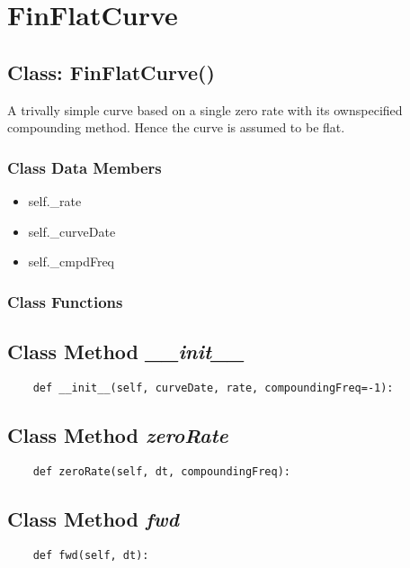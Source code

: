 \documentclass[twoside,11pt]{book}
\begin{document}
\newpage
\section{FinFlatCurve}

\subsection{Class: FinFlatCurve()}
A trivally simple curve based on a single zero rate with its ownspecified compounding method. Hence the curve is assumed to be flat. 

\subsubsection{Class Data Members}
\begin{itemize}
\item{self.\_rate}
\item{self.\_curveDate}
\item{self.\_cmpdFreq}
\end{itemize}

\subsubsection{Class Functions}

\subsection{Class Method {\it \_\_init\_\_}}


\begin{lstlisting}
    def __init__(self, curveDate, rate, compoundingFreq=-1):
\end{lstlisting}

\subsection{Class Method {\it zeroRate}}


\begin{lstlisting}
    def zeroRate(self, dt, compoundingFreq):
\end{lstlisting}

\subsection{Class Method {\it fwd}}


\begin{lstlisting}
    def fwd(self, dt):
\end{lstlisting}
\end{document}
